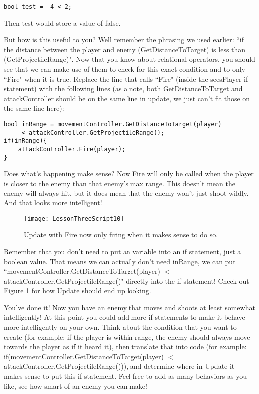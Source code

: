 \documentclass{article}
\begin{document}
\lstset{style=sharpc}
\begin{lstlisting}
bool test =  4 < 2;
\end{lstlisting}

Then test would store a value of false.

But how is this useful to you? Well remember the phrasing we used earlier: ``if the distance between the player and enemy (GetDistanceToTarget) is less than (GetProjectileRange)". Now that you know about relational operators, you should see that we can make use of them to check for this exact condition and to only ``Fire" when it is true. Replace the line that calls ``Fire" (inside the seesPlayer if statement) with the following lines (as a note, both GetDistanceToTarget and attackController should be on the same line in update, we just can't fit those on the same line here): 

\lstset{style=sharpc}
\begin{lstlisting}
bool inRange = movementController.GetDistanceToTarget(player)
	 < attackController.GetProjectileRange();
if(inRange){
	attackController.Fire(player);
}
\end{lstlisting} 

\noindent{}

Does what's happening make sense? Now Fire will only be called when the player is closer to the enemy than that enemy's max range. This doesn't mean the enemy will always hit, but it does mean that the enemy won't just shoot wildly. And that looks more intelligent! 

\begin{figure}
  \texttt{[image: LessonThreeScript10]}
  \caption{Update with Fire now only firing when it makes sense to do so.}
  \label{fig:LessonThreeScript10}
\end{figure}

Remember that you don't need to put an variable into an if statement, just a boolean value. That means we can actually don't need inRange, we can put ``movementController.\newline GetDistanceToTarget(player) $<$ attackController.GetProjectileRange()" directly into the if statement! Check out Figure \ref{fig:LessonThreeScript10} for how Update should end up looking.

You've done it! Now you have an enemy that moves and shoots at least somewhat intelligently! At this point you could add more if statements to make it behave more intelligently on your own. Think about the condition that you want to create (for example: if the player is within range, the enemy should always move towards the player as if it heard it), then translate that into code (for example: if(movementController.GetDistanceToTarget(player) $<$ attackController.GetProjectileRange())), and determine where in Update it makes sense to put this if statement. Feel free to add as many behaviors as you like, see how smart of an enemy you can make! 
\end{document}
